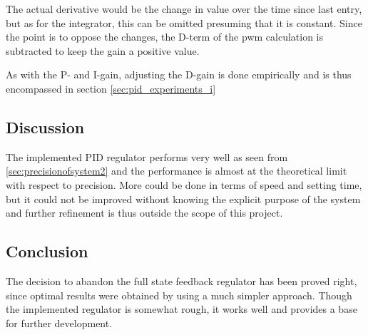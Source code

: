 The actual derivative would be the change in value over the time since last entry, but as for the integrator, this can be omitted presuming that it is constant. Since the point is to oppose the changes, the D-term of the pwm calculation is subtracted to keep the gain a positive value.

As with the P- and I-gain, adjusting the D-gain is done empirically and is thus encompassed in section \ref{sec:pid_experiments_i}


\subsection{Discussion}
The implemented PID regulator performs very well as seen from \ref{sec:precisionofsystem2} and the performance is almost at the theoretical limit with respect to precision. More could be done in terms of speed and setting time, but it could not be improved without knowing the explicit purpose of the system and further refinement is thus outside the scope of this project.

\subsection{Conclusion}
The decision to abandon the full state feedback regulator has been proved right, since optimal results were obtained by using a much simpler approach. Though the implemented regulator is somewhat rough, it works well and provides a base for further development.











